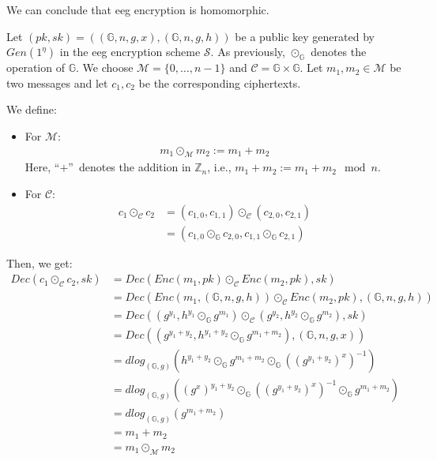 We can conclude that \gls{eeg} encryption is homomorphic.

Let $(pk, sk)=((\mathbb{G}, n, g, x), (\mathbb{G}, n, g, h))$ be a public key generated by $Gen(1^\eta)$ in the \gls{eeg} encryption scheme $\mathcal{S}$. 
As previously, $\odot_{\mathbb{G}}$ denotes the operation of $\mathbb{G}$.
We choose $\mathcal{M}=\{0,\dots, n-1\}$ and $\mathcal{C}=\mathbb{G}\times \mathbb{G}$.
Let $m_1, m_2\in\mathcal{M}$ be two messages and let $c_1, c_2$ be the corresponding ciphertexts.

We define:
\begin{itemize}
    \item For $\mathcal{M}$:
    \begin{align*}
        m_1\odot_{\mathcal{M}}m_2 := m_1 + m_2
    \end{align*}
    Here, ``$+$''\ denotes the addition in $\mathbb{Z}_n$, i.e., $m_1+m_2:=m_1+m_2\mod n$.
    \item For $\mathcal{C}$:
    \begin{align*}
        c_1\odot_{\mathcal{C}}c_2 &= (c_{1,0}, c_{1,1})\odot_\mathcal{C} (c_{2,0}, c_{2,1})\\
        &= (c_{1,0}\odot_\mathbb{G} c_{2,0}, c_{1,1}\odot_\mathbb{G} c_{2,1})
    \end{align*}
\end{itemize}

Then, we get:
\begin{align*}
    Dec(c_1 \odot_{\mathcal{C}} c_2, sk) & = Dec(Enc(m_1, pk)\odot_{\mathcal{C}} Enc(m_2, pk), sk)\\
    & = Dec(Enc(m_1, (\mathbb{G}, n, g, h))\odot_{\mathcal{C}} Enc(m_2, pk), (\mathbb{G}, n, g ,h))\\
    & = Dec((g^{y_1}, h^{y_1}\odot_{\mathbb{G}}g^{m_1})\odot_{\mathcal{C}} (g^{y_2}, h^{y_2}\odot_{\mathbb{G}}g^{m_2}), sk)\\
    & = Dec((g^{y_1+y_2}, h^{y_1+y_2}\odot_{\mathbb{G}}g^{m_1+m_2}), (\mathbb{G}, n, g, x))\\
    & = dlog_{(\mathbb{G},g)}(h^{y_1+y_2}\odot_{\mathbb{G}}g^{m_1+m_2}\odot_{\mathbb{G}} ((g^{y_1+y_2})^x)^{-1})\\
    & = dlog_{(\mathbb{G},g)}((g^x)^{y_1+y_2}\odot_{\mathbb{G}} ((g^{y_1+y_2})^x)^{-1}\odot_{\mathbb{G}}g^{m_1+m_2})\\
    & = dlog_{(\mathbb{G},g)}(g^{m_1+m_2})\\
    & = m_1+m_2\\
    & = m_1\odot_{\mathcal{M}}m_2
\end{align*}

